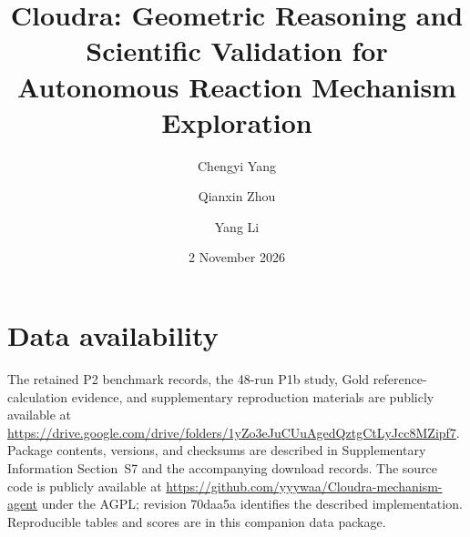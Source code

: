 \documentclass[10pt,twocolumn,a4paper]{article}
\title{Cloudra: Geometric Reasoning and Scientific Validation for Autonomous Reaction Mechanism Exploration}
\author{Chengyi Yang \and Qianxin Zhou \and Yang Li}
\date{\small 2 November 2026}
\makeatletter
\numberwithin{equation}{section}
\renewcommand{\maketitle}{%
  \twocolumn[{%
    {\centering
      {\LARGE\bfseries\@title\par}\vspace{0.6em}
      \vspace{0.6em}
      {\small\@date\par}\vspace{1.2em}}
    \begin{minipage}{\textwidth}
    \small
    \noindent\textbf{Abstract}\par\smallskip
    
    \end{minipage}\par\vspace{1.2em}}]%
}
\makeatother
\begin{document}
\maketitle
\setlength{\abovedisplayskip}{6pt plus 1pt minus 1pt}
\setlength{\belowdisplayskip}{6pt plus 1pt minus 1pt}
\setlength{\abovedisplayshortskip}{6pt plus 1pt minus 1pt}
\setlength{\belowdisplayshortskip}{6pt plus 1pt minus 1pt}






\section*{Data availability}
The retained P2 benchmark records, the 48-run P1b study, Gold reference-calculation evidence, and supplementary reproduction materials are publicly available at \url{https://drive.google.com/drive/folders/1yZo3eJuCUuAgedQztgCtLyJcc8MZipf7}. Package contents, versions, and checksums are described in Supplementary Information Section~S7 and the accompanying download records. The source code is publicly available at \url{https://github.com/yyywaa/Cloudra-mechanism-agent} under the AGPL; revision 70daa5a identifies the described implementation. Reproducible tables and scores are in this companion data package.


\end{document}
